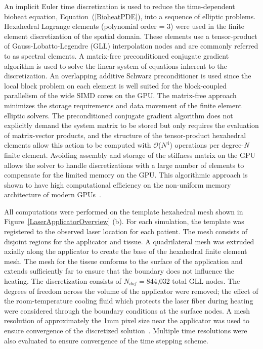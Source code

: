 \documentclass[12pt]{article}
\newcommand{\eqn}[1]{(\ref{#1})}
\begin{document}
An implicit Euler time discretization is used to reduce the 
time-dependent bioheat equation, Equation~\eqn{BioheatPDE}, into a sequence of elliptic problems. 
Hexahedral Lagrange elements (polynomial order = 3) were used in the finite
element discretization of the spatial domain.
These elements use a tensor-product of Gauss-Lobatto-Legendre (GLL) interpolation
nodes and are commonly referred to as spectral elements.  
A matrix-free preconditioned conjugate gradient algorithm is used to solve the
linear system of equations inherent to the discretization.  
An overlapping additive Schwarz preconditioner is used since the local
block problem on each element is well suited for the block-coupled
parallelism of the wide SIMD cores on the GPU.  
The matrix-free approach minimizes the storage
requirements and data movement of the finite element elliptic solvers.  The
preconditioned conjugate gradient algorithm does not explicitly demand the system
matrix to be stored but only requires the evaluation of matrix-vector products,
and the structure of the tensor-product hexahedral elements allow this action
to be computed with $\mathcal{O}$($N^4$) operations per degree-\textit{N} finite
element.  
Avoiding assembly and storage of the stiffness matrix on the GPU
allows the solver to handle discretizations with a large number of elements to
compensate for the limited memory on the GPU.  This algorithmic approach is
shown to have high computational efficiency on the non-uniform memory
architecture of modern GPUs~\cite{Medina2014}.

All computations were performed on the template hexahedral mesh
shown in Figure~\ref{LaserApplicatorOverview} (b).
For each simulation, the template was registered to the observed
laser location for each patient.
The mesh consists of disjoint regions for the applicator and tissue.
A quadrilateral mesh was extruded axially along the applicator to create
the base of the hexahedral finite element mesh. The mesh for the tissue
conforms to the surface of the application and extends sufficiently far
to ensure that the boundary does not influence the heating.
The discretization consists of $N_{dof}=$844,032 total GLL nodes. 
The degrees of freedom across the volume of the applicator were removed;
the effect of the room-temperature cooling fluid which protects the laser fiber
during heating were considered through the boundary conditions at the surface
nodes. 
{\color{red}
A mesh resolution of approximately the 1mm pixel size near the applicator was used
to ensure convergence of the discretized solution~\cite{fuentesetal11a}. 
Multiple time resolutions were also evaluated to ensure convergence of the
time stepping scheme.
}
\end{document}

